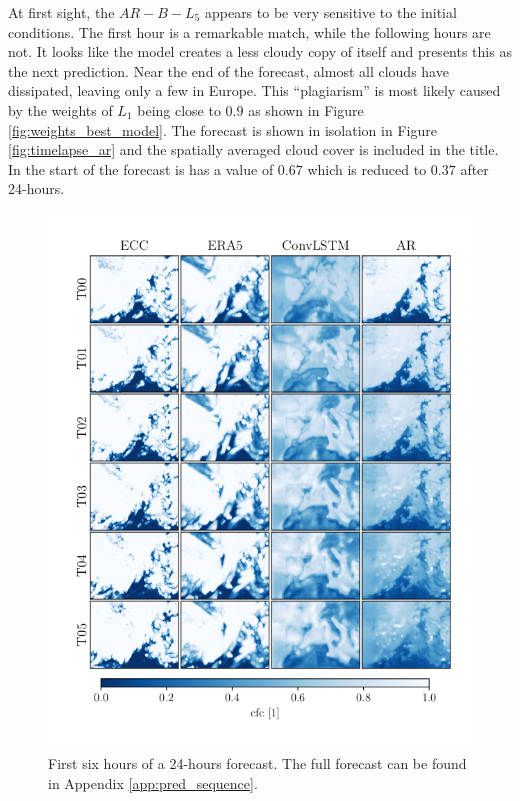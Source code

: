 At first sight, the $AR-B-L_5$ appears to be very sensitive to the initial conditions. The first hour is a remarkable match, while the following hours are not. It looks like the model creates a less cloudy copy of itself and presents this as the next prediction. Near the end of the forecast, almost all clouds have dissipated, leaving only a few in Europe. This ``plagiarism'' is most likely caused by the weights of $L_1$ being close to $0.9$ as shown in Figure \ref{fig:weights_best_model}. The forecast is shown in isolation in Figure \ref{fig:timelapse_ar} and the spatially averaged cloud cover is included in the title. In the start of the forecast is has a value of $0.67$ which is reduced to $0.37$ after 24-hours.
\begin{figure}[ht]
    \centering
    \includegraphics[sale=0.1]{python_figs/comparing_seq_part_1_of4_jan2.png}
    \caption{First six hours of a 24-hours forecast. The full forecast can be found in Appendix \ref{app:pred_sequence}.}
    \label{fig:pred_sequence}
\end{figure}

